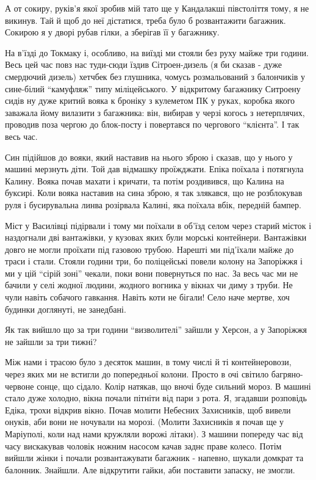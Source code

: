 А от сокиру, руків'я якої зробив мій тато ще у Кандалакші  півстоліття тому, я
не викинув. Тай й щоб до неї дістатися, треба було б розвантажити багажник.
Сокирою я у дворі рубав гілки, а зберігав її у багажнику.

На в'їзді до Токмаку і, особливо,  на виїзді ми стояли без руху майже три
години. Весь цей час повз нас туди-сюди їздив Сітроен-дизель (я би сказав -
дуже смердючий дизель) хетчбек без глушника, чомусь розмальований з балончиків
у сине-білий \enquote{камуфляж} типу міліцейського. У відкритому багажнику Ситроену
сидів ну дуже критий вояка к броніку з кулеметом ПК у руках, коробка якого
заважала йому вилазити з багажника: він, вибирав у черзі когось з нетерплячих,
проводив поза чергою до блок-посту і повертався по чергового \enquote{клієнта}. І так
весь час.

Син підійшов до вояки, який наставив на нього зброю і сказав, що у нього у
машині мерзнуть діти. Той дав відмашку проїжджати. Епіка поїхала і потягнула
Калину. Вояка почав махати і кричати, та потім роздивився, що Калина на
буксирі. Коли вояка наставив на сина зброю, я так злякався, що не розблокував
руля і бусирувальна линва розірвала Калині, яка поїхала вбік, передній бампер.

Міст у Василівці підірвали і тому ми поїхали в об'їзд селом через старий місток
і наздогнали дві вантажівки, у кузовах яких були морські контейнери. Вантажівки
довго не могли проїхати під газовою трубою. Нарешті ми під'їхали майже до траси
і стали. Стояли години три, бо поліцейські  повели колону на Запоріжжя і ми у
цій \enquote{сірій зоні} чекали, поки вони повернуться по нас. За весь час ми не бачили
у селі жодної людини, жодного вогника у вікнах чи диму з труби. Не чули навіть
собачого гавкання. Навіть коти не бігали! Село наче мертве, хоч будинки
доглянуті, не занедбані.

Як так вийшло що за три години \enquote{визволителі} зайшли у Херсон, а у Запоріжжя не
зайшли за три тижні?

Між нами і трасою було з десяток машин, в тому числі й ті контейнеровози, через
яких ми не встигли до попередньої колони. Просто в очі світило багряно-червоне
сонце, що сідало. Колір натякав, що вночі буде сильний мороз. В машині стало
дуже холодно, вікна почали пітніти від пари з рота. Я, згадавши розповідь
Едіка, трохи відкрив вікно. Почав молити Небесних Захисників, щоб вивели
онуків, аби вони не ночували на морозі. (Молити Захисників я почав ще у
Маріуполі, коли над нами кружляли ворожі літаки). З машини попереду час від
часу вискакував чоловік ножним насосом качав заднє праве колесо. Потім вийшли
жінки і почали розвантажувати багажник - напевно, шукали домкрат та балонник.
Знайшли. Але відкрутити гайки, аби поставити запаску, не змогли. 

